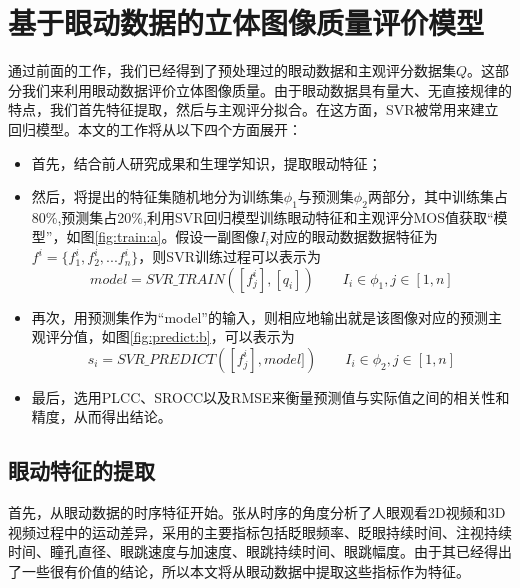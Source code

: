 \chapter{基于眼动数据的立体图像质量评价模型}
\label{chap:model}
通过前面的工作，我们已经得到了预处理过的眼动数据和主观评分数据集$Q$。这部分我们来利用眼动数据评价立体图像质量。由于眼动数据具有量大、无直接规律的特点，我们首先特征提取，然后与主观评分拟合。在这方面，SVR\parencite{scholkopf2000new}被常用来建立回归模型。本文的工作将从以下四个方面展开：
\begin{itemize}[noitemsep,topsep=0pt,parsep=0pt,partopsep=0pt]
\item 首先，结合前人研究成果和生理学知识，提取眼动特征；
\item 然后，将提出的特征集随机地分为训练集$\phi _1$与预测集$\phi _2$两部分，其中训练集占80\%,预测集占20\%,利用SVR回归模型训练眼动特征和主观评分MOS值获取“模型”，如图\ref{fig:train:a}。假设一副图像$I{}_i $对应的眼动数据数据特征为$f^i=\{f_1^i,f_2^i,...f_n^i\}$，则SVR训练过程可以表示为
\begin{equation}
model = SVR\_TRAIN([{f_j^i}],[{q_i}])\qquad I{}_i \in {\phi _1},j \in [1,n]
\end{equation}
\item 再次，用预测集作为“model”的输入，则相应地输出就是该图像对应的预测主观评分值，如图\ref{fig:predict:b}，可以表示为
\begin{equation}
s_i = SVR\_PREDICT([{f_j^i}],model])\qquad I{}_i \in {\phi _2},j \in [1,n]
\end{equation}
\item 最后，选用PLCC、SROCC以及RMSE来衡量预测值与实际值之间的相关性和精度，从而得出结论。
\end{itemize}

\begin{figure}
  \centering
  \hspace{0.2in}
\end{figure}

\section{眼动特征的提取}
\label{sec:featureextract}
首先，从眼动数据的时序特征开始。张\parencite{zhang2014application}从时序的角度分析了人眼观看2D视频和3D视频过程中的运动差异，采用的主要指标包括眨眼频率、眨眼持续时间、注视持续时间、瞳孔直径、眼跳速度与加速度、眼跳持续时间、眼跳幅度。由于其已经得出了一些很有价值的结论，所以本文将从眼动数据中提取这些指标作为特征。

